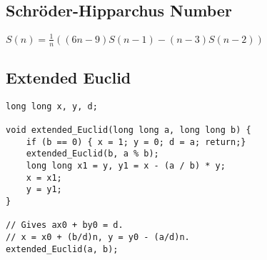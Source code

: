 \documentclass[letterpaper]{article}
\begin{document}
\subsection{Schr\"oder-Hipparchus Number}
\(S(n) = \frac{1}{n}((6n - 9)S(n - 1) - (n - 3)S(n - 2)) \)

\subsection{Extended Euclid}
\begin{lstlisting}
long long x, y, d;

void extended_Euclid(long long a, long long b) {
    if (b == 0) { x = 1; y = 0; d = a; return;}
    extended_Euclid(b, a % b);
    long long x1 = y, y1 = x - (a / b) * y;
    x = x1;
    y = y1;
}

// Gives ax0 + by0 = d.
// x = x0 + (b/d)n, y = y0 - (a/d)n.
extended_Euclid(a, b);

\end{lstlisting}
\newpage
\end{document}
